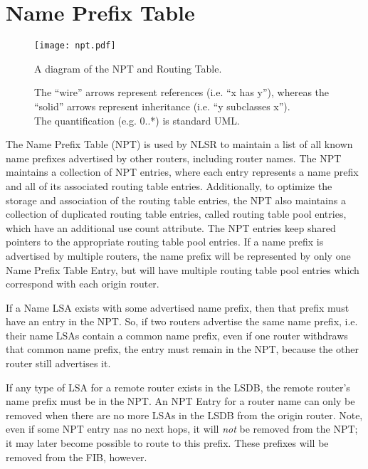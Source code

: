 \section{Name Prefix Table}
\label{sec:npt}

\begin{figure}[!h]
  \center
  \texttt{[image: npt.pdf]}
  \begin{caption}
    A diagram of the NPT and Routing Table.

    \begin{footnotesize}
      The ``wire'' arrows represent references (i.e. ``x has y''),
      whereas the ``solid'' arrows represent inheritance (i.e. ``y subclasses x''). \\
      The quantification (e.g. 0..*) is standard UML.
    \end{footnotesize}
  \end{caption}
  \label{fig:npt-class-diagram}
\end{figure}

The Name Prefix Table (NPT) is used by NLSR to maintain a list of all known name prefixes advertised by other routers, including router names.
The NPT maintains a collection of NPT entries, where each entry represents a name prefix and all of its associated routing table entries.
Additionally, to optimize the storage and association of the routing table entries, the NPT also maintains a collection of duplicated routing table entries, called routing table pool entries, which have an additional use count attribute.
The NPT entries keep shared pointers to the appropriate routing table pool entries.
If a name prefix is advertised by multiple routers, the name prefix will be represented by only one Name Prefix Table Entry, but will have multiple routing table pool entries  which correspond with each origin router.

If a Name LSA exists with some advertised name prefix, then that prefix must have an entry in the NPT. So, if two routers advertise the same name prefix, i.e. their name LSAs contain a common name prefix, even if one router withdraws that common name prefix, the entry must remain in the NPT, because the other router still advertises it.

If any type of LSA for a remote router exists in the LSDB, the remote router's name prefix must be in the NPT.
An NPT Entry for a router name can only be removed when there are no more LSAs in the LSDB from the origin router. Note, even if some NPT entry nas no next hops, it will \emph{not} be removed from the NPT; it may later become possible to route to this prefix. These prefixes will be removed from the FIB, however.

